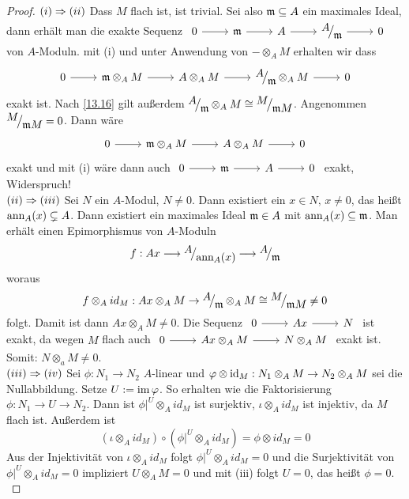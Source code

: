 \begin{proof}
	$(i) \Rightarrow (ii) $	Dass $M$ flach ist, ist trivial. Sei also $\mathfrak{m} \subseteq A $ ein maximales Ideal, dann erhält man die exakte Sequenz $\begin{tikzcd} 0 \arrow{r} & \m \arrow{r} & A \arrow{r} & \QR{A}{\m} \arrow{r} & 0 \end{tikzcd}$ von $A$-Moduln. mit (i) und unter Anwendung von $- \otimes_A M $ erhalten wir dass $$\begin{tikzcd} 0 \arrow{r} & \m \otimes_A M \arrow{r} & A \otimes_A M \arrow{r} & \QR{A}{\m} \otimes_A M \arrow{r} & 0 \end{tikzcd}$$ exakt ist. 
	Nach \ref{13.16} gilt außerdem $\QR{A}{\m} \otimes_A M \cong \QR{M}{\m M}$. Angenommen $\QR{M}{\m M} = 0$. Dann wäre $$\begin{tikzcd} 0 \arrow{r} & \m \otimes_A M \arrow{r} & A \otimes_A M \arrow{r} & 0 \end{tikzcd}$$
	exakt und mit (i) wäre dann auch $\begin{tikzcd} 0 \arrow{r} & \m \arrow{r} & A \arrow{r} &  0 \end{tikzcd}$ exakt, Widerspruch!  \\
	$(ii) \Rightarrow (iii) $ Sei $N$ ein $A$-Modul, $N \neq 0$. Dann existiert ein $x \in N,\, x \neq 0$, das heißt $\text{ann}_A(x) \subsetneq A $. Dann existiert ein maximales Ideal $\mathfrak{m} \in A $  mit $\text{ann}_A(x) \subseteq \mathfrak{m} $. Man erhält einen Epimorphismus von $A$-Moduln 
	$$f: Ax \longrightarrow \QR{A}{\ann_A(x)} \longrightarrow \QR{A}{\m}$$
	woraus $$ f \otimes_A id_M: Ax \otimes_A M \to  \QR{A}{\m} \otimes_A M \cong \QR{M}{\m M } \neq 0$$ folgt. Damit ist dann $Ax \otimes_A M \neq 0 $. Die Sequenz $\begin{tikzcd} 0 \arrow{r} & Ax \arrow{r} & N   \end{tikzcd}$ ist exakt, da wegen $M$ flach auch $\begin{tikzcd} 0 \arrow{r} & Ax \otimes_A M  \arrow{r} & N \otimes_A M \end{tikzcd}$ exakt ist. Somit: $N \otimes_a M \neq 0 $. \\
	$(iii) \Rightarrow (iv) $ Sei $\phi: N_1 \to N_2 $ $A$-linear und $\varphi \otimes \operatorname{id}_M: N_1 \otimes_A M \to N_2 \otimes_A M $ sei die Nullabbildung. Setze $U := \operatorname{im} \varphi $. So erhalten wie die Faktorisierung $\phi: N_1 \to U \to N_2$. Dann ist $\phi|^{U} \otimes_A id_M $ ist surjektiv, $\iota \otimes_A id_M $ ist injektiv, da $M$ flach ist. Außerdem ist
	$$(\iota \otimes_A id_M) \circ (\phi|^{U} \otimes_A id_M) = \phi \otimes id_M = 0$$
	Aus der Injektivität von $\iota \otimes_A id_M $  folgt $\phi|^{U} \otimes_A id_M = 0 $ und die Surjektivität von $\phi|^{U} \otimes_A id_M = 0 $ impliziert $U \otimes_A M =  0 $ und mit (iii) folgt $U = 0 $, das heißt $\phi = 0.$ \\

\end{proof}
